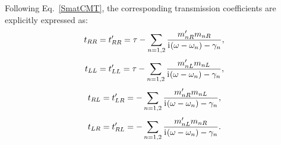 \documentclass[
    reprint,
    superscriptaddress,
    a4paper,
    amsmath,amssymb,
    prb,
]{revtex4-2}
\newcommand{\iu}{\mathrm{i}\mkern1mu}
\begin{document}
Following  Eq.~\eqref{SmatCMT}, the corresponding transmission coefficients are explicitly expressed as:
\begin{equation}\label{tRR}
	t_{RR}=t'_{RR}=\tau-\sum_{n=1,2} \frac{m^{\prime}_{nR}m_{nR}}{\iu(\omega-\omega_n)-\gamma_n},
\end{equation} 
\begin{equation}\label{tLL}
	t_{LL}=t'_{LL}=\tau-\sum_{n=1,2} \frac{m^{\prime}_{nL}m_{nL}}{\iu (\omega-\omega_n)-\gamma_n},
\end{equation} 
\begin{equation}\label{tRL}
	t_{RL}=t'_{LR}=-\sum_{n=1,2} \frac{m^{\prime}_{nR}m_{nL}}{\iu(\omega-\omega_n)-\gamma_n},
\end{equation} 
\begin{equation}\label{tLR}
	t_{LR}=t'_{RL}=-\sum_{n=1,2} \frac{m^{\prime}_{nL}m_{nR}}{\iu(\omega-\omega_n)-\gamma_n}.
\end{equation} 
\end{document}
